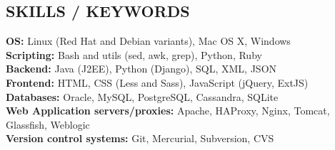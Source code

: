 \documentclass[margin,line]{resume}
\begin{document}
\begin{resume}
\sectionline

    \section{\mysidestyle \textbf{\large{S}\small{KILLS} / \large{K}\small{EYWORDS}}}

    \textbf{OS:} Linux (Red Hat and Debian variants), Mac OS X, Windows \\
    \textbf{Scripting:} Bash and utils (sed, awk, grep), Python, Ruby\\
    \textbf{Backend:} Java (J2EE), Python (Django), SQL, XML, JSON\\
    \textbf{Frontend:} HTML, CSS (Less and Sass), JavaScript (jQuery, ExtJS)\\
    \textbf{Databases:} Oracle, MySQL, PostgreSQL, Cassandra, SQLite\\
    \textbf{Web Application servers/proxies:} Apache, HAProxy, Nginx, Tomcat, Glassfish, Weblogic\\
    \textbf{Version control systems:} Git, Mercurial, Subversion, CVS\\
\end{resume}
\end{document}
